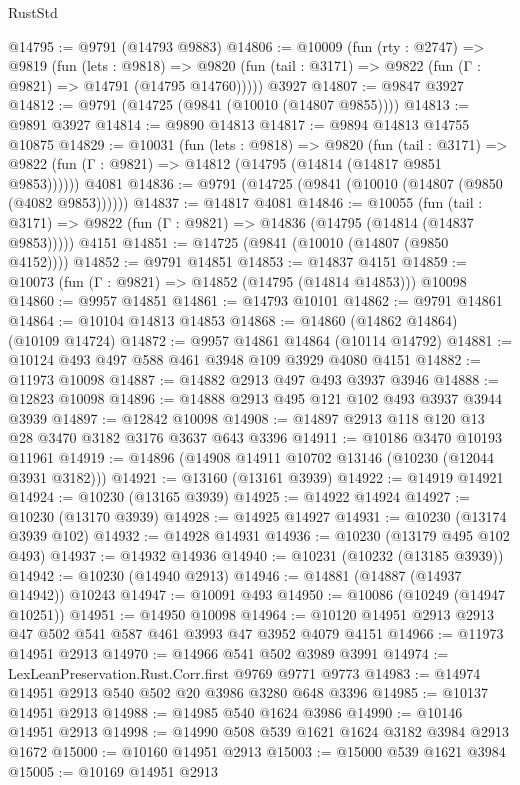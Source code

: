 \begin{lexlean}{RustStd}
\begin{coremodule}
@14795 := @9791 (@14793 @9883)
@14806 := @10009
    (fun (rty : @2747) =>
    @9819
      (fun (lets : @9818) =>
      @9820 (fun (tail : @3171) => @9822 (fun (Γ : @9821) => @14791 (@14795 @14760)))))
    @3927
@14807 := @9847 @3927
@14812 := @9791 (@14725 (@9841 (@10010 (@14807 @9855))))
@14813 := @9891 @3927
@14814 := @9890 @14813
@14817 := @9894 @14813 @14755 @10875
@14829 := @10031
    (fun (lets : @9818) =>
    @9820
      (fun (tail : @3171) =>
      @9822 (fun (Γ : @9821) => @14812 (@14795 (@14814 (@14817 @9851 @9853))))))
    @4081
@14836 := @9791 (@14725 (@9841 (@10010 (@14807 (@9850 (@4082 @9853))))))
@14837 := @14817 @4081
@14846 := @10055
    (fun (tail : @3171) => @9822 (fun (Γ : @9821) => @14836 (@14795 (@14814 (@14837 @9853)))))
    @4151
@14851 := @14725 (@9841 (@10010 (@14807 (@9850 @4152))))
@14852 := @9791 @14851
@14853 := @14837 @4151
@14859 := @10073 (fun (Γ : @9821) => @14852 (@14795 (@14814 @14853))) @10098
@14860 := @9957 @14851
@14861 := @14793 @10101
@14862 := @9791 @14861
@14864 := @10104 @14813 @14853
@14868 := @14860 (@14862 @14864) (@10109 @14724)
@14872 := @9957 @14861 @14864 (@10114 @14792)
@14881 := @10124 @493 @497 @588 @461 @3948 @109 @3929 @4080 @4151
@14882 := @11973 @10098
@14887 := @14882 @2913 @497 @493 @3937 @3946
@14888 := @12823 @10098
@14896 := @14888 @2913 @495 @121 @102 @493 @3937 @3944 @3939
@14897 := @12842 @10098
@14908 := @14897 @2913 @118 @120 @13 @28 @3470 @3182 @3176 @3637 @643 @3396
@14911 := @10186 @3470 @10193 @11961
@14919 := @14896 (@14908 @14911 @10702 @13146 (@10230 (@12044 @3931 @3182)))
@14921 := @13160 (@13161 @3939)
@14922 := @14919 @14921
@14924 := @10230 (@13165 @3939)
@14925 := @14922 @14924
@14927 := @10230 (@13170 @3939)
@14928 := @14925 @14927
@14931 := @10230 (@13174 @3939 @102)
@14932 := @14928 @14931
@14936 := @10230 (@13179 @495 @102 @493)
@14937 := @14932 @14936
@14940 := @10231 (@10232 (@13185 @3939))
@14942 := @10230 (@14940 @2913)
@14946 := @14881 (@14887 (@14937 @14942)) @10243
@14947 := @10091 @493
@14950 := @10086 (@10249 (@14947 @10251))
@14951 := @14950 @10098
@14964 := @10120 @14951 @2913 @2913 @47 @502 @541 @587 @461 @3993 @47 @3952 @4079 @4151
@14966 := @11973 @14951 @2913
@14970 := @14966 @541 @502 @3989 @3991
@14974 := LexLeanPreservation.Rust.Corr.first @9769 @9771 @9773
@14983 := @14974 @14951 @2913 @540 @502 @20 @3986 @3280 @648 @3396
@14985 := @10137 @14951 @2913
@14988 := @14985 @540 @1624 @3986
@14990 := @10146 @14951 @2913
@14998 := @14990 @508 @539 @1621 @1624 @3182 @3984 @2913 @1672
@15000 := @10160 @14951 @2913
@15003 := @15000 @539 @1621 @3984
@15005 := @10169 @14951 @2913

\end{coremodule}
\end{lexlean}
